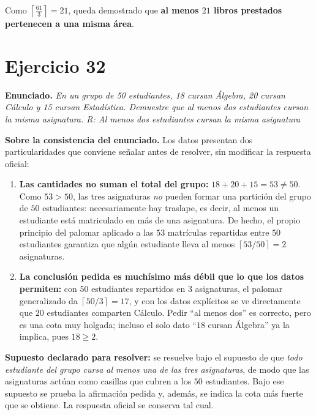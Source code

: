 \documentclass[11pt]{article}
\begin{document}
\begin{resp}
Como $\left\lceil \frac{61}{3}\right\rceil = 21$, queda demostrado que \textbf{al menos $21$ libros prestados pertenecen a una misma \'area}.
\end{resp}

\section*{Ejercicio 32}

\textbf{Enunciado.} \emph{En un grupo de 50 estudiantes, 18 cursan \'Algebra, 20 cursan C\'alculo y 15 cursan Estad\'istica. Demuestre que al menos dos estudiantes cursan la misma asignatura. R: Al menos dos estudiantes cursan la misma asignatura}

\begin{nota}
\textbf{Sobre la consistencia del enunciado.} Los datos presentan dos particularidades que conviene se\~nalar antes de resolver, sin modificar la respuesta oficial:

\begin{enumerate}[leftmargin=*]
  \item \textbf{Las cantidades no suman el total del grupo:} $18+20+15 = 53 \ne 50$. Como $53>50$, las tres asignaturas \emph{no} pueden formar una partici\'on del grupo de $50$ estudiantes: necesariamente hay traslape, es decir, al menos un estudiante est\'a matriculado en m\'as de una asignatura. De hecho, el propio principio del palomar aplicado a las $53$ matr\'iculas repartidas entre $50$ estudiantes garantiza que alg\'un estudiante lleva al menos $\left\lceil 53/50\right\rceil = 2$ asignaturas.
  \item \textbf{La conclusi\'on pedida es much\'isimo m\'as d\'ebil que lo que los datos permiten:} con $50$ estudiantes repartidos en $3$ asignaturas, el palomar generalizado da $\left\lceil 50/3\right\rceil = 17$, y con los datos expl\'icitos se ve directamente que $20$ estudiantes comparten C\'alculo. Pedir ``al menos dos'' es correcto, pero es una cota muy holgada; incluso el solo dato ``$18$ cursan \'Algebra'' ya la implica, pues $18\ge 2$.
\end{enumerate}

\textbf{Supuesto declarado para resolver:} se resuelve bajo el supuesto de que \emph{todo estudiante del grupo cursa al menos una de las tres asignaturas}, de modo que las asignaturas act\'uan como casillas que cubren a los $50$ estudiantes. Bajo ese supuesto se prueba la afirmaci\'on pedida y, adem\'as, se indica la cota m\'as fuerte que se obtiene. La respuesta oficial se conserva tal cual.
\end{nota}
\end{document}
